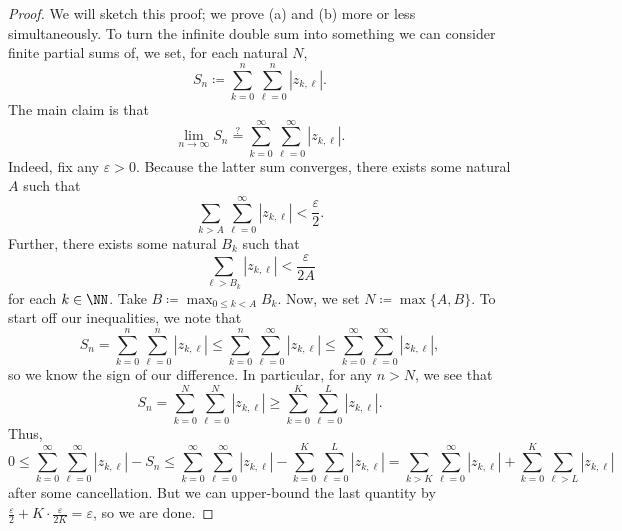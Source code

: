 \documentclass[../notes.tex]{subfiles}
\begin{document}
\begin{proof}
	We will sketch this proof; we prove (a) and (b) more or less simultaneously. To turn the infinite double sum into something we can consider finite partial sums of, we set, for each natural $N$,
	\[S_n\coloneqq \sum_{k=0}^n\sum_{\ell=0}^n|z_{k,\ell}|.\]
	The main claim is that
	\[\lim_{n\to\infty}S_n\stackrel?=\sum_{k=0}^\infty\sum_{\ell=0}^\infty|z_{k,\ell}|.\]
	Indeed, fix any $\varepsilon>0$. Because the latter sum converges, there exists some natural $A$ such that
	\[\sum_{k>A}\sum_{\ell=0}^\infty|z_{k,\ell}|<\frac\varepsilon2.\]
	Further, there exists some natural $B_k$ such that
	\[\sum_{\ell>B_k}|z_{k,\ell}|<\frac\varepsilon{2A}\]
	for each $k\in\NN$. Take $B\coloneqq \max_{0\le k<A}B_k$. Now, we set $N\coloneqq \max\{A,B\}$. To start off our inequalities, we note that
	\[S_n=\sum_{k=0}^n\sum_{\ell=0}^n|z_{k,\ell}|\le\sum_{k=0}^n\sum_{\ell=0}^\infty|z_{k,\ell}|\le\sum_{k=0}^\infty\sum_{\ell=0}^\infty|z_{k,\ell}|,\]
	so we know the sign of our difference. In particular, for any $n>N$, we see that
	\[S_n=\sum_{k=0}^N\sum_{\ell=0}^N|z_{k,\ell}|\ge\sum_{k=0}^K\sum_{\ell=0}^L|z_{k,\ell}|.\]
	Thus,
	\[0\le\sum_{k=0}^\infty\sum_{\ell=0}^\infty|z_{k,\ell}|-S_n\le\sum_{k=0}^\infty\sum_{\ell=0}^\infty|z_{k,\ell}|-\sum_{k=0}^K\sum_{\ell=0}^L|z_{k,\ell}|=\sum_{k>K}\sum_{\ell=0}^\infty|z_{k,\ell}|+\sum_{k=0}^K\sum_{\ell>L}|z_{k,\ell}|\]
	after some cancellation. But we can upper-bound the last quantity by $\frac\varepsilon2+K\cdot\frac\varepsilon{2K}=\varepsilon$, so we are done.


\end{proof}
\end{document}
